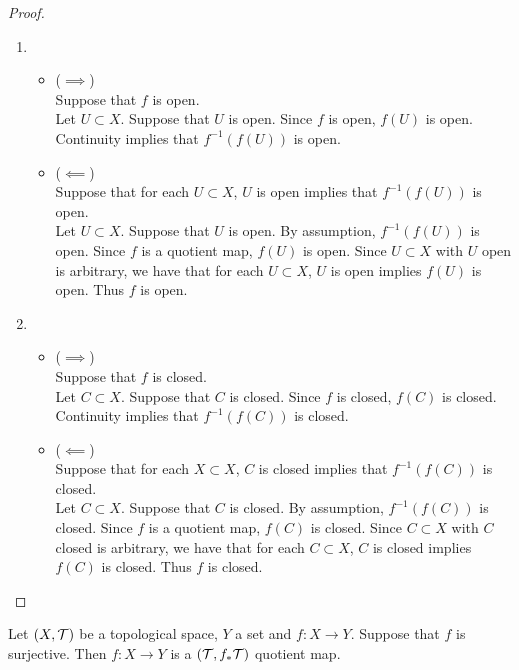 \documentclass{book}
\begin{document}
	\begin{proof}\
	\begin{enumerate}
		\item 
		\begin{itemize}	
			\item ($\implies$) \\
			Suppose that $f$ is open.\\
			Let $U \subset X$. Suppose that $U$ is open. Since $f$ is open, $f(U)$ is open. Continuity implies that $f^{-1}(f(U))$ is open.\\ 
			\item ($\impliedby$) \\
			Suppose that for each $U \subset X$, $U$ is open implies that $f^{-1}(f(U))$ is open. \\
			Let $U \subset X$. Suppose that $U$ is open. By assumption, $f^{-1}(f(U))$ is open. Since $f$ is a quotient map, $f(U)$ is open. Since $U \subset X$ with $U$ open is arbitrary, we have that for each $U \subset X$, $U$ is open implies $f(U)$ is open. Thus $f$ is open.
		\end{itemize}
		\item 
		\begin{itemize}	
			\item ($\implies$) \\
			Suppose that $f$ is closed.\\
			Let $C \subset X$. Suppose that $C$ is closed. Since $f$ is closed, $f(C)$ is closed. Continuity implies that $f^{-1}(f(C))$ is closed.\\ 
			\item ($\impliedby$) \\
			Suppose that for each $X \subset X$, $C$ is closed implies that $f^{-1}(f(C))$ is closed. \\
			Let $C \subset X$. Suppose that $C$ is closed. By assumption, $f^{-1}(f(C))$ is closed. Since $f$ is a quotient map, $f(C)$ is closed. Since $C \subset X$ with $C$ closed is arbitrary, we have that for each $C \subset X$, $C$ is closed implies $f(C)$ is closed. Thus $f$ is closed.
		\end{itemize}
	\end{enumerate}
	\end{proof}
	
	\begin{ex} 
	Let $(X, \mathcal{T})$ be a topological space, $Y$ a set and $f:X \rightarrow Y$. Suppose that $f$ is surjective. Then $f: X \rightarrow Y$ is a $(\mathcal{T}, f_*\mathcal{T})$ quotient map. 
	\end{ex}
	
\end{document}
